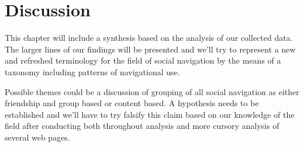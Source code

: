 \chapter{Discussion}
\label{chapter:discussion}

This chapter will include a synthesis based on the analysis of our collected
data. The larger lines of our findings will be presented and we'll try to
represent a new and refreshed terminology for the field of social navigation
by the means of a taxonomy including patterns of navigational use.

Possible themes could be a discussion of grouping of all social navigation as
either friendship and group based or content based. A hypothesis needs to be
established and we'll have to try falsify this claim based on our knowledge of
the field after conducting both throughout analysis and more cursory analysis
of several web pages.
